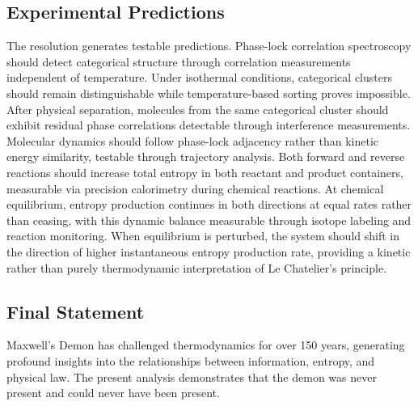 \documentclass[12pt,a4paper]{article}
\theoremstyle{definition}
\theoremstyle{remark}
\begin{document}
\subsection{Experimental Predictions}

The resolution generates testable predictions. Phase-lock correlation spectroscopy should detect categorical structure through correlation measurements independent of temperature. Under isothermal conditions, categorical clusters should remain distinguishable while temperature-based sorting proves impossible. After physical separation, molecules from the same categorical cluster should exhibit residual phase correlations detectable through interference measurements. Molecular dynamics should follow phase-lock adjacency rather than kinetic energy similarity, testable through trajectory analysis. Both forward and reverse reactions should increase total entropy in both reactant and product containers, measurable via precision calorimetry during chemical reactions. At chemical equilibrium, entropy production continues in both directions at equal rates rather than ceasing, with this dynamic balance measurable through isotope labeling and reaction monitoring. When equilibrium is perturbed, the system should shift in the direction of higher instantaneous entropy production rate, providing a kinetic rather than purely thermodynamic interpretation of Le Chatelier's principle.

\subsection{Final Statement}

Maxwell's Demon has challenged thermodynamics for over 150 years, generating profound insights into the relationships between information, entropy, and physical law. The present analysis demonstrates that the demon was never present and could never have been present.
\end{document}
